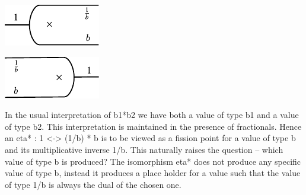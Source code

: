 \documentclass[preprint]{sigplanconf}
\begin{document}
\begin{multicols}{2}
\begin{center}
  \includegraphics{diagrams/eta_times.pdf}
\end{center}
  
\begin{center}
  \includegraphics{diagrams/eps_times.pdf}
\end{center}
\end{multicols}

In the usual interpretation of {{b1*b2}} we have both a value of type {{b1}}
and a value of type {{b2}}. This interpretation is maintained in the presence
of fractionals. Hence an {{eta* : 1 <-> (1/b) * b}} is to be viewed as a
fission point for a value of type {{b}} and its multiplicative inverse
{{1/b}}. This naturally raises the question -- which value of type {{b}} is
produced? The isomorphism {{eta*}} does not produce any specific value of
type {{b}}, instead it produces a place holder for a value such that the
value of type {{1/b}} is always the dual of the chosen one.

\begin{multicols}{2}
\begin{center}
\end{center}

\begin{center}
\end{center}  
\end{multicols}
\end{document}
